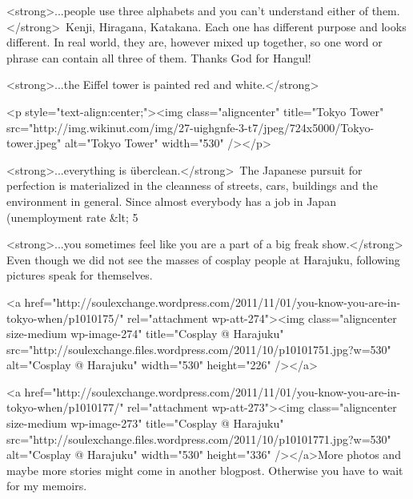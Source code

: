 \begin{post}
\begin{content}
<strong>...people use three alphabets and you can't understand either of them.</strong> Kenji, Hiragana, Katakana. Each one has different purpose and looks different. In real world, they are, however mixed up together, so one word or phrase can contain all three of them. Thanks God for Hangul!



<strong>...the Eiffel tower is painted red and white.</strong>

<p style="text-align:center;"><img class="aligncenter" title="Tokyo Tower" src="http://img.wikinut.com/img/27-uighgnfe-3-t7/jpeg/724x5000/Tokyo-tower.jpeg" alt="Tokyo Tower" width="530" /></p>

<strong>...everything is überclean.</strong> The Japanese pursuit for perfection is materialized in the cleanness of streets, cars, buildings and the environment in general. Since almost everybody has a job in Japan (unemployment rate &lt; 5%



<strong>...you sometimes feel like you are a part of a big freak show.</strong> Even though we did not see the masses of cosplay people at Harajuku, following pictures speak for themselves.



<a href="http://soulexchange.wordpress.com/2011/11/01/you-know-you-are-in-tokyo-when/p1010175/" rel="attachment wp-att-274"><img class="aligncenter size-medium wp-image-274" title="Cosplay @ Harajuku" src="http://soulexchange.files.wordpress.com/2011/10/p10101751.jpg?w=530" alt="Cosplay @ Harajuku" width="530" height="226" /></a>



<a href="http://soulexchange.wordpress.com/2011/11/01/you-know-you-are-in-tokyo-when/p1010177/" rel="attachment wp-att-273"><img class="aligncenter size-medium wp-image-273" title="Cosplay @ Harajuku" src="http://soulexchange.files.wordpress.com/2011/10/p10101771.jpg?w=530" alt="Cosplay @ Harajuku" width="530" height="336" /></a>More photos and maybe more stories might come in another blogpost. Otherwise you have to wait for my memoirs.
	\end{content}
\end{post}

